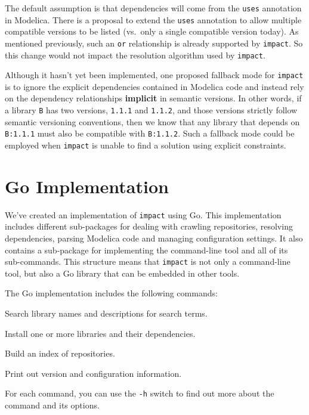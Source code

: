 \documentclass[11pt,a4paper,twocolumn]{article}
\newcommand{\code}[1]{\texttt{#1}} %
\begin{document}
The default assumption is that dependencies will come from the
\code{uses} annotation in Modelica.  There is a proposal to extend the
\code{uses} annotation to allow multiple compatible versions to be
listed (vs.\ only a single compatible version today).  As mentioned
previously, such an \code{or} relationship is already supported by
\code{impact}.  So this change would not impact the resolution
algorithm used by \code{impact}.

Although it hasn't yet been implemented, one proposed fallback mode
for \code{impact} is to ignore the explicit dependencies contained in
Modelica code and instead rely on the dependency relationships
\textbf{implicit} in semantic versions.  In other words, if a library
\code{B} has two versions, \code{1.1.1} and \code{1.1.2}, and those
versions strictly follow semantic versioning conventions, then we know
that any library that depends on \code{B:1.1.1} must also be
compatible with \code{B:1.1.2}.  Such a fallback mode could be
employed when \code{impact} is unable to find a solution using
explicit constraints.

\section{Go Implementation}

We've created an implementation of \code{impact} using Go.
This implementation includes different sub-packages for dealing with
crawling repositories, resolving dependencies, parsing Modelica code
and managing configuration settings.  It also contains a sub-package
for implementing the command-line tool and all of its sub-commands.
This structure means that \code{impact} is not only a command-line
tool, but also a Go library that can be embedded in other tools.

The Go implementation includes the following commands:
\begin{description}[noitemsep]
  \item[\code{search}] Search library names and descriptions for
    search terms.
  \item[\code{install}] Install one or more libraries and their
    dependencies.
  \item[\code{index}] Build an index of repositories.
  \item[\code{version}] Print out version and configuration
    information.
\end{description}

For each command, you can use the \code{-h} switch to find out more
about the command and its options.
\end{document}
